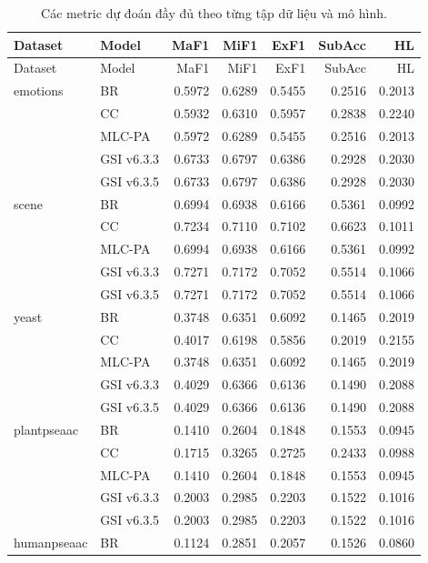 \documentclass[11pt,a4paper,twoside]{article}
\begin{document}
\begin{landscape}
\begin{longtable}{llrrrrr}
\caption{Các metric dự đoán đầy đủ theo từng tập dữ liệu và mô hình.}\label{tab:appendix-1}\\
\toprule
Dataset & Model & MaF1 & MiF1 & ExF1 & SubAcc & HL \\
\midrule
\endfirsthead
\toprule
Dataset & Model & MaF1 & MiF1 & ExF1 & SubAcc & HL \\
\midrule
\endhead
emotions & BR & 0.5972 & 0.6289 & 0.5455 & 0.2516 & 0.2013 \\
 & CC & 0.5932 & 0.6310 & 0.5957 & 0.2838 & 0.2240 \\
 & MLC-PA & 0.5972 & 0.6289 & 0.5455 & 0.2516 & 0.2013 \\
 & GSI v6.3.3 & 0.6733 & 0.6797 & 0.6386 & 0.2928 & 0.2030 \\
 & GSI v6.3.5 & 0.6733 & 0.6797 & 0.6386 & 0.2928 & 0.2030 \\
\addlinespace[2pt]
scene & BR & 0.6994 & 0.6938 & 0.6166 & 0.5361 & 0.0992 \\
 & CC & 0.7234 & 0.7110 & 0.7102 & 0.6623 & 0.1011 \\
 & MLC-PA & 0.6994 & 0.6938 & 0.6166 & 0.5361 & 0.0992 \\
 & GSI v6.3.3 & 0.7271 & 0.7172 & 0.7052 & 0.5514 & 0.1066 \\
 & GSI v6.3.5 & 0.7271 & 0.7172 & 0.7052 & 0.5514 & 0.1066 \\
\addlinespace[2pt]
yeast & BR & 0.3748 & 0.6351 & 0.6092 & 0.1465 & 0.2019 \\
 & CC & 0.4017 & 0.6198 & 0.5856 & 0.2019 & 0.2155 \\
 & MLC-PA & 0.3748 & 0.6351 & 0.6092 & 0.1465 & 0.2019 \\
 & GSI v6.3.3 & 0.4029 & 0.6366 & 0.6136 & 0.1490 & 0.2088 \\
 & GSI v6.3.5 & 0.4029 & 0.6366 & 0.6136 & 0.1490 & 0.2088 \\
\addlinespace[2pt]
plantpseaac & BR & 0.1410 & 0.2604 & 0.1848 & 0.1553 & 0.0945 \\
 & CC & 0.1715 & 0.3265 & 0.2725 & 0.2433 & 0.0988 \\
 & MLC-PA & 0.1410 & 0.2604 & 0.1848 & 0.1553 & 0.0945 \\
 & GSI v6.3.3 & 0.2003 & 0.2985 & 0.2203 & 0.1522 & 0.1016 \\
 & GSI v6.3.5 & 0.2003 & 0.2985 & 0.2203 & 0.1522 & 0.1016 \\
\addlinespace[2pt]
humanpseaac & BR & 0.1124 & 0.2851 & 0.2057 & 0.1526 & 0.0860 \\

\end{longtable}
\end{landscape}
\end{document}
